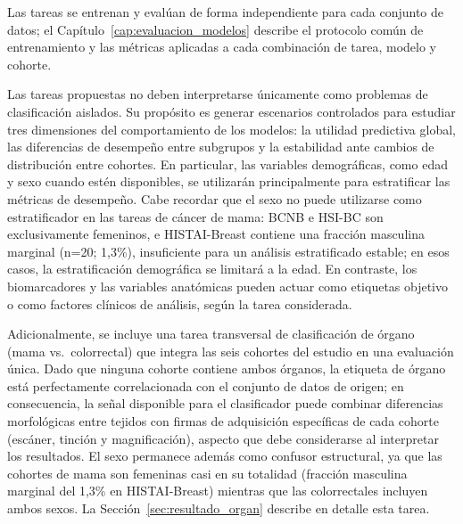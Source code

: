 Las tareas se entrenan y evalúan de forma independiente para cada conjunto de datos; el Capítulo~\ref{cap:evaluacion_modelos} describe el protocolo común de entrenamiento y las métricas aplicadas a cada combinación de tarea, modelo y cohorte.

Las tareas propuestas no deben interpretarse únicamente como problemas de clasificación aislados. Su propósito es generar escenarios controlados para estudiar tres dimensiones del comportamiento de los modelos: la utilidad predictiva global, las diferencias de desempeño entre subgrupos y la estabilidad ante cambios de distribución entre cohortes. En particular, las variables demográficas, como edad y sexo cuando estén disponibles, se utilizarán principalmente para estratificar las métricas de desempeño. Cabe recordar que el sexo no puede utilizarse como estratificador en las tareas de cáncer de mama: BCNB e HSI-BC son exclusivamente femeninos, e HISTAI-Breast contiene una fracción masculina marginal (n=20; 1,3\%), insuficiente para un análisis estratificado estable; en esos casos, la estratificación demográfica se limitará a la edad. En contraste, los biomarcadores y las variables anatómicas pueden actuar como etiquetas objetivo o como factores clínicos de análisis, según la tarea considerada.

Adicionalmente, se incluye una tarea transversal de clasificación de órgano (mama vs.\ colorrectal) que integra las seis cohortes del estudio en una evaluación única. Dado que ninguna cohorte contiene ambos órganos, la etiqueta de órgano está perfectamente correlacionada con el conjunto de datos de origen; en consecuencia, la señal disponible para el clasificador puede combinar diferencias morfológicas entre tejidos con firmas de adquisición específicas de cada cohorte (escáner, tinción y magnificación), aspecto que debe considerarse al interpretar los resultados. El sexo permanece además como confusor estructural, ya que las cohortes de mama son femeninas casi en su totalidad (fracción masculina marginal del 1,3\% en HISTAI-Breast) mientras que las colorrectales incluyen ambos sexos. La Sección~\ref{sec:resultado_organ} describe en detalle esta tarea.


